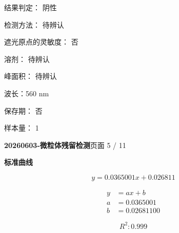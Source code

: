 \documentclass[UTF8,10pt,a4paper,fontset=fandol]{ctexart}
\newcommand{\fieldvalue}[1]{#1}
\begin{document}
\noindent
结果判定：
\fieldvalue{阴性}

\noindent
检测方法：
\fieldvalue{待辨认}

\noindent
遮光原点的灵敏度：
\fieldvalue{否}

\noindent
溶剂：
\fieldvalue{待辨认}

\noindent
峰面积：
\fieldvalue{待辨认}

\noindent
波长：560 nm

\noindent
保存期：
\fieldvalue{否}

\noindent
样本量：
\fieldvalue{1}

\newpage

\noindent\textbf{20260603-微粒体残留检测}\hfill 页面 5 / 11

\begin{center}
\textbf{标准曲线}
\end{center}

\begin{center}
\end{center}

\[
y = 0.0365001x + 0.026811
\]

\[
\begin{aligned}
y &= ax+b\\
a &= 0.0365001\\
b &= 0.02681100
\end{aligned}
\]

\[
R^2: 0.999
\]
\end{document}
